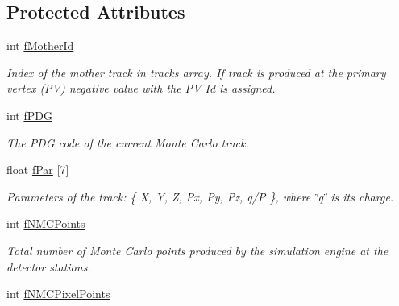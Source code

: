\subsection*{Protected Attributes}
\begin{DoxyCompactItemize}
\item 
int \hyperlink{classKFMCTrack_a9e683b839f23428f807de774af689467}{f\+Mother\+Id}\hypertarget{classKFMCTrack_a9e683b839f23428f807de774af689467}{}\label{classKFMCTrack_a9e683b839f23428f807de774af689467}

\begin{DoxyCompactList}\small\item\em Index of the mother track in tracks array. If track is produced at the primary vertex (PV) negative value with the PV Id is assigned. \end{DoxyCompactList}\item 
int \hyperlink{classKFMCTrack_ac219c1249ea3583df69eaff39bb2058d}{f\+P\+DG}\hypertarget{classKFMCTrack_ac219c1249ea3583df69eaff39bb2058d}{}\label{classKFMCTrack_ac219c1249ea3583df69eaff39bb2058d}

\begin{DoxyCompactList}\small\item\em The P\+DG code of the current Monte Carlo track. \end{DoxyCompactList}\item 
float \hyperlink{classKFMCTrack_ab36c74aaad27e04eb0ae56afd538ba77}{f\+Par} \mbox{[}7\mbox{]}\hypertarget{classKFMCTrack_ab36c74aaad27e04eb0ae56afd538ba77}{}\label{classKFMCTrack_ab36c74aaad27e04eb0ae56afd538ba77}

\begin{DoxyCompactList}\small\item\em Parameters of the track\+: \{ X, Y, Z, Px, Py, Pz, q/P \}, where \char`\"{}q\char`\"{} is its charge. \end{DoxyCompactList}\item 
int \hyperlink{classKFMCTrack_ac261323b51266d63d1bb6335e8428600}{f\+N\+M\+C\+Points}\hypertarget{classKFMCTrack_ac261323b51266d63d1bb6335e8428600}{}\label{classKFMCTrack_ac261323b51266d63d1bb6335e8428600}

\begin{DoxyCompactList}\small\item\em Total number of Monte Carlo points produced by the simulation engine at the detector stations. \end{DoxyCompactList}\item 
int \hyperlink{classKFMCTrack_a7e91b033a3f0856258c0906ed5bcb293}{f\+N\+M\+C\+Pixel\+Points}\hypertarget{classKFMCTrack_a7e91b033a3f0856258c0906ed5bcb293}{}\label{classKFMCTrack_a7e91b033a3f0856258c0906ed5bcb293}


\end{DoxyCompactItemize}
